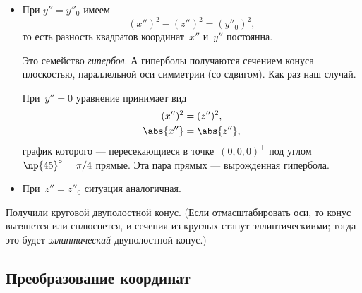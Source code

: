 \begin{solution}
\begin{itemize}
			Это уравнение кругового конуса с осью, направленной вдоль~$Ox''$ с центром в начале координат.



		\item При $y'' = y''_0$ имеем
			\[
				(x'')^2 - (z'')^2 = (y''_0)^2,
			\]
			то есть разность квадратов координат~$x''$ и~$y''$ постоянна.

			Это семейство \emph{гипербол}. А гиперболы получаются сечением конуса плоскостью, параллельной оси симметрии (со сдвигом). Как раз наш случай.

			При~$y'' = 0$ уравнение принимает вид
			\begin{align*}
				(x'')^2 &= (z'')^2,
				\\
				\abs{x''} &= \abs{z''},
			\end{align*}
			график которого --- пересекающиеся в точке~$(0, 0, 0)^\top$ под углом~$\np{45}^\circ = \pi/4$ прямые. Эта пара прямых --- вырожденная гипербола.

		\item При~$z'' = z''_0$ ситуация аналогичная.
			
	\end{itemize}


	Получили круговой двуполостной конус. (Если отмасштабировать оси, то конус вытянется или сплюснется, и сечения из круглых станут эллиптическиими; тогда это будет \emph{эллиптический} двуполостной конус.)

	\subsection{Преобразование координат}


\end{solution}

